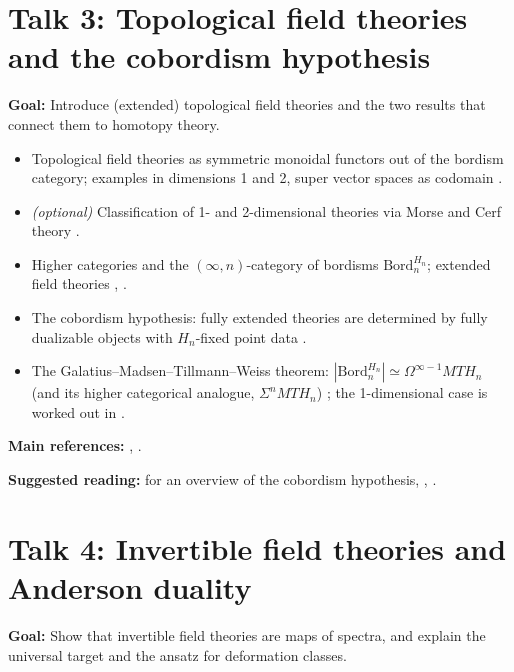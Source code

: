 \documentclass[11pt,a4paper]{article}
\newcommand{\MT}{\mathit{MT}}
\newcommand{\talk}[2]{\section*{Talk #1: #2}}
\newcommand{\refs}[1]{\par\smallskip\textbf{Main references:} #1}
\newcommand{\suggested}[1]{\par\textbf{Suggested reading:} #1}
\begin{document}
\talk{3}{Topological field theories and the cobordism hypothesis}

\textbf{Goal:} Introduce (extended) topological field theories and the two results that connect them to homotopy theory.

\begin{itemize}
  \item Topological field theories as symmetric monoidal functors out of the bordism category; examples in dimensions 1 and 2, super vector spaces as codomain \cite[L1.2, L1.4]{F}.
  \item \emph{(optional)} Classification of 1- and 2-dimensional theories via Morse and Cerf theory \cite[L4]{F}.
  \item Higher categories and the $(\infty,n)$-category of bordisms $\mathrm{Bord}_n^{H_n}$; extended field theories \cite[L5.1--L5.3]{F}, \cite[\S5.1]{FH}.
  \item The cobordism hypothesis: fully extended theories are determined by fully dualizable objects with $H_n$-fixed point data \cite[L5.6]{F}.
  \item The Galatius--Madsen--Tillmann--Weiss theorem: $|\mathrm{Bord}_n^{H_n}| \simeq \Omega^{\infty-1}\MT H_n$ (and its higher categorical analogue, $\Sigma^n \MT H_n$) \cite[L6.6, Theorem~6.67]{F}; the 1-dimensional case is worked out in \cite[L6.3]{F}.
\end{itemize}
\refs{\cite[L1, L4, L5, L6.3, L6.6]{F}, \cite[\S5.1]{FH}.}
\suggested{\cite{Fcob} for an overview of the cobordism hypothesis, \cite{L}, \cite{GMTW}.}

\talk{4}{Invertible field theories and Anderson duality}

\textbf{Goal:} Show that invertible field theories are maps of spectra, and explain the universal target and the ansatz for deformation classes.
\end{document}
